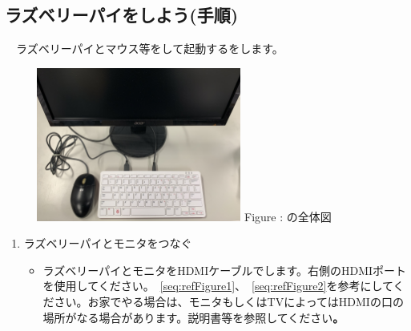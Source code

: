 \documentclass[a4paper,12pt]{jarticle}
\begin{document}
\begin{enumerate}
          \clearpage
\subsection{ラズベリーパイをしよう(手順)}
\ \ ラズベリーパイとマウス等をして起動するをします。

\begin{figure}[ht]
  \centering
  \begin{minipage}{12.204cm}
    {\upshape
      \includegraphics[width=0.6\textwidth]{connections01-2023.jpg}
      \newline
      Figure : の全体図}

  \end{minipage}
\end{figure}

\begin{enumerate}
  \item ラズベリーパイとモニタをつなぐ

        \begin{itemize}
          \item
                ラズベリーパイとモニタをHDMIケーブルでします。右側のHDMIポートを使用してください。~\ref{seq:refFigure1}、~\ref{seq:refFigure2}を参考にしてください。お家でやる場合は、モニタもしくはTVによってはHDMIの口の場所がなる場合があります。説明書等を参照してください\textbf{。}



\end{itemize}
\end{enumerate}
\end{enumerate}
\end{document}
